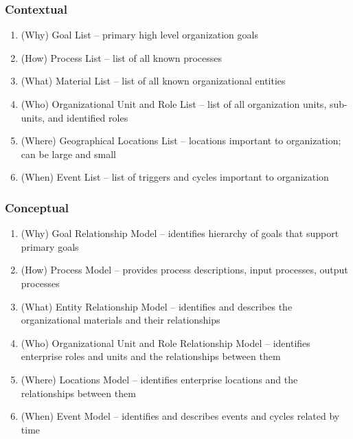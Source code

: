 \documentclass[12pt,a4paper,final,twoside,onecolumn,titlepage]{book}
\begin{document}
\subsubsection{Contextual}
\begin{enumerate}
\item (Why) Goal List – primary high level organization goals
\item (How) Process List – list of all known processes
\item (What) Material List – list of all known organizational entities
\item (Who) Organizational Unit and Role List – list of all organization units, sub-units, and identified roles
\item (Where) Geographical Locations List – locations important to organization; can be large and small
\item (When) Event List – list of triggers and cycles important to organization
\end{enumerate}
\subsubsection{Conceptual}
\begin{enumerate}
\item (Why) Goal Relationship Model – identifies hierarchy of goals that support primary goals
\item (How) Process Model – provides process descriptions, input processes, output processes
\item (What) Entity Relationship Model – identifies and describes the organizational materials and their relationships
\item (Who) Organizational Unit and Role Relationship Model – identifies enterprise roles and units and the relationships between them
\item (Where) Locations Model – identifies enterprise locations and the relationships between them
\item (When) Event Model – identifies and describes events and cycles related by time
\end{enumerate}
\end{document}
